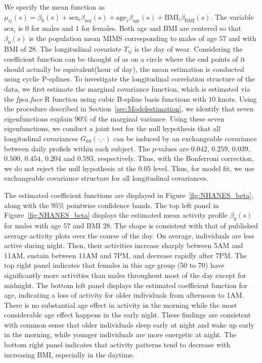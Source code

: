 \documentclass[submit]{smj}
\begin{document}
We specify the mean function as $\mu_{ij}(s) = \beta_0(s) + \text{sex}_i\beta_{\text{sex}}(s) + \text{age}_{i}\beta_{\text{age}}(s) + \text{BMI}_{i}\beta_{\text{BMI}}(s)$. The variable $\text{sex}_i$ is $0$ for males and $1$ for females. Both age and BMI are centered so that $\beta_0(s)$ is the population mean MIMS corresponding to males of age $57$ and with BMI of $28$. The longitudinal covariate $T_{ij}$ is the day of wear. Considering the coefficient function can be thought of as on a circle where the end points of it should actually be equivalent(hour of day), the mean estimation is conducted using cyclic P-splines. To investigate the longitudinal correlation structure of the data,  we first estimate the marginal covariance function, which is estimated via the  {\it fpca.face} R function using cubic B-spline basis functions with $10$ knots. Using the procedure described in Section~\ref{sec:Modelestimation}, we identify that seven eigenfunctions explain $90\%$ of the marginal variance. Using these seven eigenfunctions, we conduct a joint test for the null hypothesis that all longitudinal covariances $G_{k0}(\cdot,\cdot)$ can be induced by an exchangeable covariance between daily profiels within each subject. The $p$-values are $0.042$, $0.259$, $0.039$, $0.500$, $0.454$, $0.204$ and $0.593$, respectively. Thus, with the Bonferroni correction, we do not reject the null hypothesis at the 0.05 level. Thus, for model fit, we use exchangeable covariance structure for all longitudinal covariances.


The estimated coefficient functions are displayed in Figure~\ref{fig:NHANES_beta}, along with the $95\%$ pointwise confidence bands. The top left panel in Figure~\ref{fig:NHANES_beta} displays the estimated mean activity profile $\beta_0(s)$ for males with age $57$ and BMI $28$. The shape is consistent with that of published average activity plots over the course of the day. On average, individuals are less active during night. Then, their activities  increase sharply between 5AM and 11AM, sustain between 11AM and 7PM, and decrease rapidly after 7PM. The top right panel indicates that females in this age group (50 to 70) have significantly more activities than males throughout most of the day except for midnight. The bottom left panel displays the estimated coefficient function for age, indicating a loss of activity for older individuals from afternoon to 1AM. There is no substantial age effect in activity in the morning  while the most considerable age effect happens in the early night. These findings are consistent with common sense that older individuals sleep early at night and wake up early in the morning, while younger individuals are more energetic at night. The bottom right panel indicates that activity patterns tend to decrease with increasing BMI, especially in the daytime. 
\end{document}
